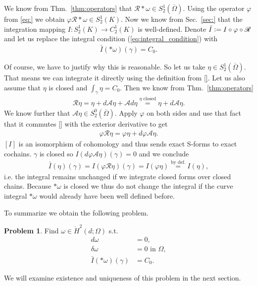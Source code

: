 \documentclass[12pt,a4paper]{article}
\numberwithin{equation}{subsection}
\numberwithin{lemma}{subsection}
\theoremstyle{definition}
\newtheorem{problem}[lemma]{Problem}
\newcommand{\aop}{\mathscr{A}}
\newcommand{\omegabar}{\overline{\Omega}}
\newcommand{\rop}{\mathscr{R}} %
\begin{document}
We know from Thm.~\ref{thm:operators} that $\rop *\omega \in S^1_2(\omegabar)$.
Using the operator $\varphi$ from \ref{eq:} we obtain 
$\varphi \rop *\omega \in S^1_2(K)$. Now we know from Sec.~\ref{sec:} that 
the integration mapping $I: S^1_2(K) \rightarrow C^1_2(K)$ is well-defined.
Denote $\bar{I} \vcentcolon= I\circ \varphi \circ \rop$ and 
let us replace the integral condition (\ref{eq:integral_condition}) with 
\begin{align*}
    \bar{I}(*\omega)(\gamma) = C_0.
\end{align*}

Of course, we have to justify why this is reasonable. 
So let us take $\eta \in S^1_2(\omegabar)$. That means we can integrate it 
directly using the definition from \ref{}. 
Let us also assume that $\eta$ is closed and 
$\int_\gamma \eta = C_0$. %
Then we know from Thm.~\ref{thm:operators}
\begin{align*}
    \rop \eta = \eta + d\aop \eta + \aop d\eta 
    \stackrel{\eta \text{ closed}}{=} \eta + d\aop \eta.
\end{align*}
We know further that $\aop \eta \in S^0_2(\omegabar)$. 
Apply $\varphi$ on both sides and use that fact that it commutes 
\ref{} with the 
exterior derivative to get
\begin{align*}
    \varphi \rop \eta = \varphi\eta + d \varphi\aop \eta.
\end{align*}
$[I]$ is an isomorphism of cohomology and thus sends exact S-forms to exact 
cochains. $\gamma$ is closed so $I(d \varphi\aop \eta)(\gamma) = 0$ and 
we conclude 
\begin{align*}
    \bar{I}(\eta)(\gamma) = I(\varphi \rop \eta)(\gamma) = I(\varphi \eta)
    \stackrel{\text{by def.}}{=} I(\eta),
\end{align*}
i.e. the integral remains unchanged if we integrate closed forms over 
closed chains. Because $*\omega$ is closed we thus do not change the integral 
if the curve integral $*\omega$ would already have been well defined before.

To summarize we obtain the following problem.
\begin{problem} \label{prob:magnetostatic_reformulated}
    Find $\omega \in \mathring{H}^2(d;\Omega)$ s.t.
    \begin{align*}
        d \omega &= 0, \\
        \delta \omega &= 0 \text{ in $\Omega$}, \\
        \bar{I}(*\omega)(\gamma)  &= C_0.
    \end{align*}
\end{problem}
\noindent We will examine existence and 
uniqueness of this problem in the next section.
\end{document}
